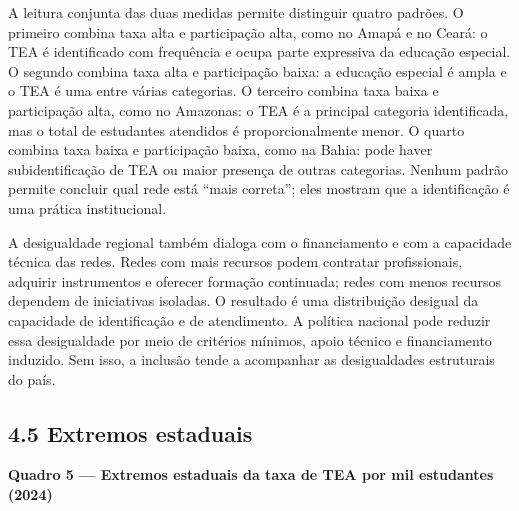A leitura conjunta das duas medidas permite distinguir quatro padrões. O
primeiro combina taxa alta e participação alta, como no Amapá e no
Ceará: o TEA é identificado com frequência e ocupa parte expressiva da
educação especial. O segundo combina taxa alta e participação baixa: a
educação especial é ampla e o TEA é uma entre várias categorias. O
terceiro combina taxa baixa e participação alta, como no Amazonas: o TEA
é a principal categoria identificada, mas o total de estudantes
atendidos é proporcionalmente menor. O quarto combina taxa baixa e
participação baixa, como na Bahia: pode haver subidentificação de TEA ou
maior presença de outras categorias. Nenhum padrão permite concluir qual
rede está ``mais correta''; eles mostram que a identificação é uma
prática institucional.

A desigualdade regional também dialoga com o financiamento e com a
capacidade técnica das redes. Redes com mais recursos podem contratar
profissionais, adquirir instrumentos e oferecer formação continuada;
redes com menos recursos dependem de iniciativas isoladas. O resultado é
uma distribuição desigual da capacidade de identificação e de
atendimento. A política nacional pode reduzir essa desigualdade por meio
de critérios mínimos, apoio técnico e financiamento induzido. Sem isso,
a inclusão tende a acompanhar as desigualdades estruturais do país.

\subsection{4.5 Extremos estaduais}\label{extremos-estaduais}


\textbf{Quadro 5 --- Extremos estaduais da taxa de TEA por mil
estudantes (2024)}

\begingroup\small

